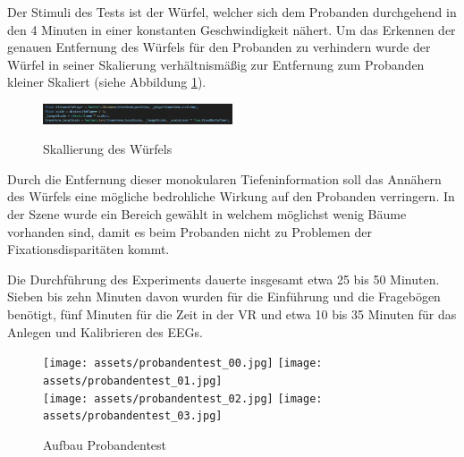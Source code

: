 \documentclass[conference]{IEEEtran}
\begin{document}
Der Stimuli des Tests ist der Würfel, welcher sich dem Probanden durchgehend in den 4 Minuten in einer konstanten Geschwindigkeit nähert. Um das Erkennen der genauen Entfernung des Würfels für den Probanden zu verhindern wurde der Würfel in seiner Skalierung verhältnismäßig zur Entfernung zum Probanden kleiner Skaliert (siehe Abbildung \ref{fig:scale_cube}). 
\begin{figure}[ht]
	\centering
	\includegraphics[width=0.5\textwidth]{assets/Scalling.jpg} \\
	\caption{Skallierung des Würfels}
	\label{fig:scale_cube}
\end{figure}
Durch die Entfernung dieser monokularen Tiefeninformation soll das Annähern des Würfels eine mögliche bedrohliche Wirkung auf den Probanden verringern. In der Szene wurde ein Bereich gewählt in welchem möglichst wenig Bäume  vorhanden sind, damit es beim Probanden nicht zu Problemen der Fixationsdisparitäten kommt.

Die Durchführung des Experiments dauerte insgesamt etwa 25 bis 50 Minuten. Sieben bis zehn Minuten davon wurden für die Einführung und die Fragebögen benötigt, fünf Minuten für die Zeit in der VR und etwa 10 bis 35 Minuten für das Anlegen und Kalibrieren des EEGs. 

\begin{figure}[ht]
	\centering
	\texttt{[image: assets/probandentest\_00.jpg]} \hspace{-5pt}
	\texttt{[image: assets/probandentest\_01.jpg]} \\
	\vspace{2pt}
	\texttt{[image: assets/probandentest\_02.jpg]} \hspace{-5pt}
	\texttt{[image: assets/probandentest\_03.jpg]} \hspace{-5pt}
	\caption{Aufbau Probandentest}
	\label{fig:structure_probandentest}
\end{figure}
\end{document}
